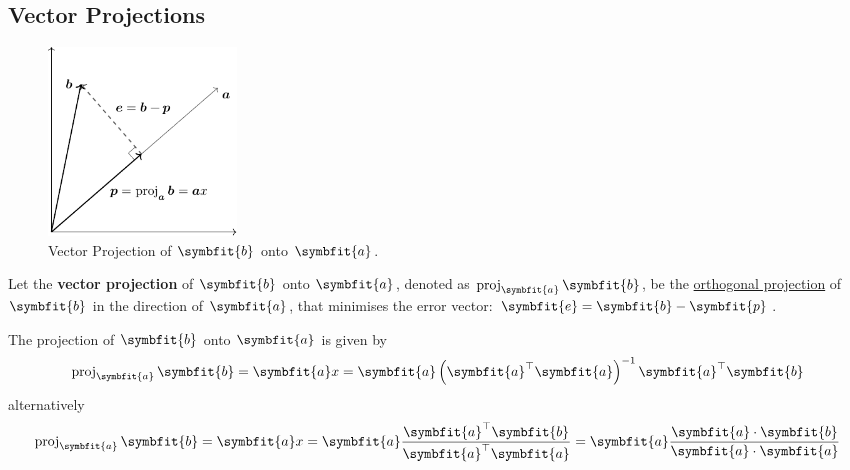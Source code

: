 \documentclass{article}
\begin{document}
\subsection{Vector Projections}
\begin{figure}[H]
    \centering
    \includegraphics[height=5cm, keepaspectratio]{figures/vector_projection}
    \caption{Vector Projection of \(\symbfit{b}\) onto \(\symbfit{a}\).}
\end{figure}
\begin{definition}
    Let the \textbf{vector projection} of \(\symbfit{b}\) onto
    \(\symbfit{a}\), denoted as \(\proj_{\symbfit{a}}\symbfit{b}\), be
    the \linebreak \underline{orthogonal projection} of \(\symbfit{b}\)
    in the direction of \(\symbfit{a}\), that minimises the error
    vector: \(\symbfit{e}=\symbfit{b}-\symbfit{p}\).
\end{definition}
\begin{theorem}
    The projection of \(\symbfit{b}\) onto \(\symbfit{a}\) is given by
    \begin{equation*}
        \proj_{\symbfit{a}}\symbfit{b} = \symbfit{a} x = \symbfit{a} \left( \symbfit{a}^\top \symbfit{a} \right)^{-1}\symbfit{a}^\top \symbfit{b}
    \end{equation*}
    alternatively
    \begin{equation*}
        \proj_{\symbfit{a}}\symbfit{b} = \symbfit{a} x = \symbfit{a} \frac{\symbfit{a}^\top \symbfit{b}}{\symbfit{a}^\top \symbfit{a}} = \symbfit{a} \frac{\symbfit{a}\cdot\symbfit{b}}{\symbfit{a}\cdot\symbfit{a}}
    \end{equation*}
\end{theorem}
\end{document}
